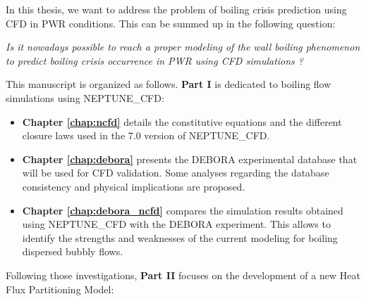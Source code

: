 In this thesis, we want to address the problem of boiling crisis prediction using CFD in PWR conditions. This can be summed up in the following question:

\npar

\begin{center}
\textit{Is it nowadays possible to reach a proper modeling of the wall boiling phenomenon to predict boiling crisis occurrence in PWR using CFD simulations ?}
\end{center}
%
%
%
%
%
%

\npar

This manuscript is organized as follows. \textbf{Part I} is dedicated to boiling flow simulations using NEPTUNE\_CFD:

\begin{itemize}
\item \textbf{Chapter \ref{chap:ncfd}} details the constitutive equations and the different closure laws used in the 7.0 version of NEPTUNE\_CFD. 

\item \textbf{Chapter \ref{chap:debora}} presents the DEBORA experimental database that will be used for CFD validation. Some analyses regarding the database consistency and physical implications are proposed.

\item \textbf{Chapter \ref{chap:debora_ncfd}} compares the simulation results obtained using NEPTUNE\_CFD with the DEBORA experiment. This allows to identify the strengths and weaknesses of the current modeling for boiling dispersed bubbly flows.

\end{itemize}


Following those investigations, \textbf{Part II} focuses on the development of a new Heat Flux Partitioning Model:

